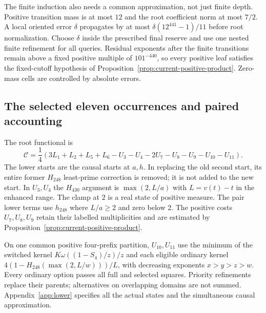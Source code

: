 The finite induction also needs a common approximation, not just
finite depth.  Positive transition mass is at most $12$ and the
root coefficient norm at most $7/2$.  A local oriented error
$\delta$ propagates by at most
$\delta(12^{441}-1)/11$ before root normalization.  Choose
$\delta$ inside the prescribed final reserve and use one nested
finite refinement for all queries.  Residual exponents after the
finite transitions remain above a fixed positive multiple of
$101^{-440}$, so every positive leaf satisfies the fixed-cutoff
hypothesis of Proposition~\ref{prop:current-positive-product}.
Zero-mass cells are controlled by absolute errors.

\subsection{The selected eleven occurrences and paired accounting}

The root functional is
\begin{equation}
 \mathcal C=\frac14
   (3L_1+L_2+L_5+L_6-U_3-U_4-2U_7-U_8-U_9-U_{10}-U_{11}).
 \label{eq:current-root-functional}
\end{equation}
The lower starts are the causal starts at $a,h$.  In replacing the
old second start, its entire former $H_{248}$ least-prime correction
is removed; it is not added to the new start.  In $U_3,U_4$ the
$H_{430}$ argument is $\max(2,L/a)$ with $L=v(t)-t$ in the enhanced
range.  The clamp at $2$ is a real state of positive measure.
The pair lower terms use $h_{248}$ where $L/a\ge2$ and zero below
$2$.  The positive costs $U_7,U_8,U_9$ retain their labelled
multiplicities and are estimated by
Proposition~\ref{prop:current-positive-product}.

On one common positive four-prefix partition, $U_{10},U_{11}$ use
the minimum of the switched kernel
$K\omega((1-S_4)/z)/z$ and each eligible ordinary kernel
$4(1-H_{248}(\max(2,L/w)))/L$, with decreasing exponents
$x>y>z>w$.  Every ordinary option passes all full and selected
squares.  Priority refinements replace their parents; alternatives
on overlapping domains are not summed.  Appendix~\ref{app:lower}
specifies all the actual states and the simultaneous causal
approximation.

